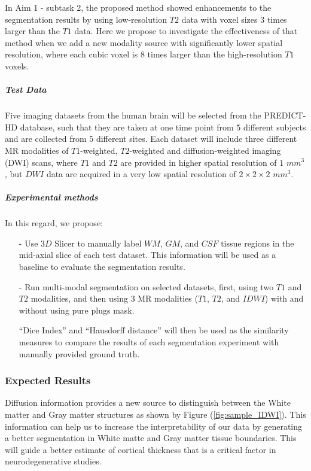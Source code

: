 In Aim 1 - subtask 2, the proposed method showed enhancements to the segmentation results by using low-resolution $T2$ data with voxel sizes $3$ times larger than the $T1$ data.
Here we propose to investigate the effectiveness of that method when we add a new modality source with significantly lower spatial resolution, where each cubic voxel is $8$ times larger than the high-resolution $T1$ voxels.

\subparagraph{Test Data}

Five imaging datasets from the human brain will be selected from the PREDICT-HD database, such that they are taken at one time point from $5$ different subjects and are collected from $5$ different sites. Each dataset will include three different MR modalities of $T1$-weighted, $T2$-weighted and diffusion-weighted imaging (DWI) scans, where $T1$ and $T2$ are provided in higher spatial resolution of $1$ $mm^3$, but $DWI$ data are acquired in a very low spatial resolution of $2 \times 2 \times 2$ $mm^3$.

\subparagraph{Experimental methods}

In this regard, we propose:
\begin{itemize}
    \item[-] Use $3D$ Slicer \cite{slicer_paper} to manually label $WM$, $GM$, and $CSF$ tissue regions in the mid-axial slice of each test dataset. This information will be used as a baseline to evaluate the segmentation results.
    \item[-] Run multi-modal segmentation on selected datasets, first, using two $T1$ and $T2$ modalities, and then using $3$ MR modalities ($T1$, $T2$, and $IDWI$) with and without using pure plugs mask.

    ``Dice Index'' and ``Hausdorff distance'' will then be used as the similarity measures to compare the results of each segmentation experiment with manually provided ground truth.
\end{itemize}

\subsubsection{Expected Results}

Diffusion information provides a new source to distinguish between the White matter and Gray matter structures as shown by Figure (\ref{fig:sample_IDWI}). This information can help us to increase the interpretability of our data by generating a better segmentation in White matte and Gray matter tissue boundaries. This will guide a better estimate of cortical thickness that is a critical factor in neurodegenerative studies.
\newline

